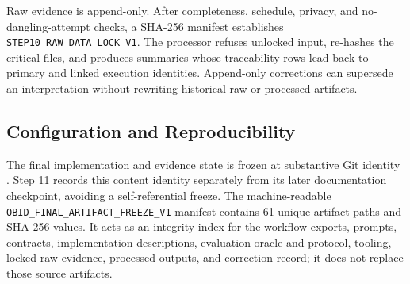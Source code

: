 Raw evidence is append-only. After completeness, schedule, privacy, and
no-dangling-attempt checks, a SHA-256 manifest establishes
\texttt{STEP10\_RAW\_DATA\_LOCK\_V1}. The processor refuses unlocked input,
re-hashes the critical files, and produces summaries whose traceability rows
lead back to primary and linked execution identities. Append-only corrections
can supersede an interpretation without rewriting historical raw or processed
artifacts.

\subsection{Configuration and Reproducibility}\label{subsec:impl-reproducibility}

The final implementation and evidence state is frozen at substantive Git
identity
\texttt{}. Step 11
records this content identity separately from its later documentation
checkpoint, avoiding a self-referential freeze. The machine-readable
\texttt{OBID\_FINAL\_ARTIFACT\_FREEZE\_V1} manifest contains 61 unique
artifact paths and SHA-256 values. It acts as an integrity index for the
workflow exports, prompts, contracts, implementation descriptions,
evaluation oracle and protocol, tooling, locked raw evidence, processed
outputs, and correction record; it does not replace those source artifacts.

